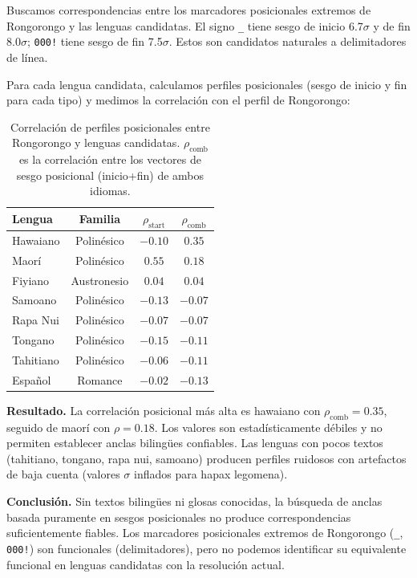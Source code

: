 \documentclass[11pt,a4paper]{article}
\newcommand{\1}{\mathbf{1}}
\numberwithin{equation}{section}
\begin{document}
Buscamos correspondencias entre los marcadores posicionales extremos de Rongorongo y las lenguas candidatas. El signo \texttt{\_} tiene sesgo de inicio 6.7$\sigma$ y de fin 8.0$\sigma$; \texttt{000!} tiene sesgo de fin 7.5$\sigma$. Estos son candidatos naturales a delimitadores de línea.

Para cada lengua candidata, calculamos perfiles posicionales (sesgo de inicio y fin para cada tipo) y medimos la correlación con el perfil de Rongorongo:

\begin{table}[h]
\centering
\caption{Correlación de perfiles posicionales entre Rongorongo y lenguas candidatas. $\rho_{\text{comb}}$ es la correlación entre los vectores de sesgo posicional (inicio+fin) de ambos idiomas.}
\label{tab:anchor_search}
\begin{tabular}{lccc}
\toprule
Lengua & Familia & $\rho_{\text{start}}$ & $\rho_{\text{comb}}$ \\
\midrule
Hawaiano & Polinésico & $-0.10$ & $\mathbf{0.35}$ \\
Maorí & Polinésico & $0.55$ & $0.18$ \\
Fiyiano & Austronesio & $0.04$ & $0.04$ \\
Samoano & Polinésico & $-0.13$ & $-0.07$ \\
Rapa Nui & Polinésico & $-0.07$ & $-0.07$ \\
Tongano & Polinésico & $-0.15$ & $-0.11$ \\
Tahitiano & Polinésico & $-0.06$ & $-0.11$ \\
Español & Romance & $-0.02$ & $-0.13$ \\
\bottomrule
\end{tabular}
\end{table}

\textbf{Resultado.} La correlación posicional más alta es hawaiano con $\rho_{\text{comb}}=0.35$, seguido de maorí con $\rho=0.18$. Los valores son estadísticamente débiles y no permiten establecer anclas bilingües confiables. Las lenguas con pocos textos (tahitiano, tongano, rapa nui, samoano) producen perfiles ruidosos con artefactos de baja cuenta (valores $\sigma$ inflados para hapax legomena).

\textbf{Conclusión.} Sin textos bilingües ni glosas conocidas, la búsqueda de anclas basada puramente en sesgos posicionales no produce correspondencias suficientemente fiables. Los marcadores posicionales extremos de Rongorongo (\texttt{\_}, \texttt{000!}) son funcionales (delimitadores), pero no podemos identificar su equivalente funcional en lenguas candidatas con la resolución actual.
\end{document}

